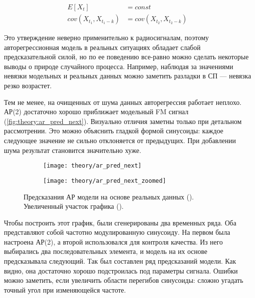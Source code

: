 \begin{equation}
  \begin{split}
    E[X_t] & = const \\
    cov(X_{t_1}, X_{t_1-k}) & = cov(X_{t_2}, X_{t_2-k})
  \end{split}
\end{equation}

Это утверждение неверно применительно к радиосигналам, поэтому авторегрессионная модель в реальных ситуациях обладает слабой предсказательной силой, но по ее поведению все-равно можно сделать некоторые выводы о природе случайного процесса. Например, наблюдая за значениями невязки модельных и реальных данных можно заметить разладки в СП --- невязка резко возрастет.

Тем не менее, на очищенных от шума данных авторегрессия работает неплохо. АР(2) достаточно хорошо приближает модельный FM сигнал (\autoref{fig:theory:ar_pred_next}). Визуально отличия заметны только при детальном рассмотрении. Это можно объяснить гладкой формой синусоиды: каждое следующее значение не сильно отклоняется от предыдущих. При добавлении шума результат становится значительно хуже.

\begin{figure}[h]
  \centering
  \begin{subfigure}{0.45\textwidth}
    \texttt{[image: theory/ar\_pred\_next]}
    \caption{}
    \label{fig:theory:ar_pred_next_whole}
  \end{subfigure}
  \begin{subfigure}{0.45\textwidth}
    \texttt{[image: theory/ar\_pred\_next\_zoomed]}
    \caption{}
    \label{fig:theory:ar_pred_next_zoomed}
  \end{subfigure}
  \caption{Предсказания АР модели на основе реальных данных (). Увеличенный участок графика ().}
  \label{fig:theory:ar_pred_next}
\end{figure}

Чтобы построить этот график, были сгенерированы два временных ряда. Оба представляют собой частотно модулированную синусоиду. На первом была настроена АР(2), а второй использовался для контроля качества. Из него выбирались два последовательных элемента, и модель на их основе предсказывала следующий. Так был составлен ряд предсказаний модели. Как видно, она достаточно хорошо подстроилась под параметры сигнала. Ошибки можно заметить, если увеличить области перегибов синусоиды: сложно угадать точный угол при изменяющейся частоте.

